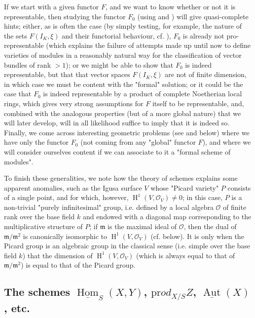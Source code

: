 If we start with a given functor $F$, and we want to know whether or not it is representable, then studying the functor $F_0$ (using  and ) will give quasi-complete hints;
either, as is often the case (by simply testing, for example, the nature of the sets $F(I_K,\xi)$ and their functorial behaviour, cf. ), $F_0$ is already not pro-representable (which explains the failure of attempts made up until now to define varieties of modules in a reasonably natural way for the classification of vector bundles of rank $>1$);
or we might be able to show that $F_0$ is indeed representable, but that that vector spaces $F(I_K,\xi)$ are not of finite dimension, in which case we must be content with the "formal" solution;
or it could be the case that $F_0$ is indeed representable by a product of complete Noetherian local rings, which gives very strong assumptions for $F$ itself to be representable, and, combined with the analogous properties (but of a more global nature) that we will later develop, will in all likelihood suffice to imply that it is indeed so.
Finally, we come across interesting geometric problems (see  and  below) where we have only the functor $F_0$ (not coming from any "global" functor $F$), and where we will consider ourselves content if we can associate to it a "formal scheme of modules".


To finish these generalities, we note how the theory of schemes explains some apparent anomalies, such as the Igusa surface $V$ whose "Picard variety" $P$ consists of a single point, and for which, however, $\operatorname{H}^1(V,\mathcal{O}_V)\neq0$;
in this case, $P$ is a non-trivial "purely infinitesimal" group, i.e. defined by a local algebra $\mathcal{O}$ of finite rank over the base field $k$ and endowed with a diagonal map corresponding to the multiplicative structure of $P$;
if $\mathfrak{m}$ is the maximal ideal of $\mathcal{O}$, then the dual of $\mathfrak{m}/\mathfrak{m}^2$ is canonically isomorphic to $\operatorname{H}^1(V,\mathcal{O}_V)$ (cf.  below).
It is only when the Picard group is an algebraic group in the classical sense (i.e. simple over the base field $k$) that the dimension of $\operatorname{H}^1(V,\mathcal{O}_V)$ (which is always equal to that of $\mathfrak{m}/\mathfrak{m}^2$) is equal to that of the Picard group.


\subsection{The schemes $\underline{\operatorname{Hom}}_S(X,Y)$, $\mathrm{pr}od_{X/S}Z$, $\underline{\operatorname{Aut}}(X)$, etc.}\label{fga3.ii-c.2}

